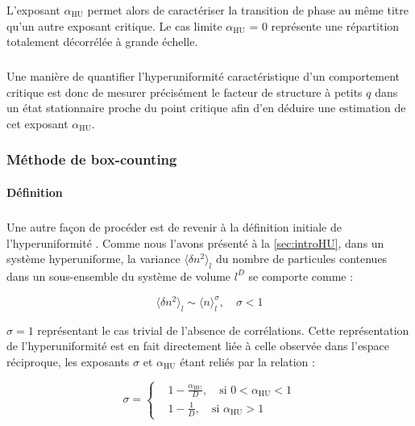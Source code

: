 \noindent L'exposant $\alpha_\text{HU}$ permet alors de caractériser la transition de phase au même titre qu'un autre exposant critique. Le cas limite $\alpha_\text{HU}$ = 0 représente une répartition totalement décorrélée à grande échelle.

\subparagraph{}Une manière de quantifier l'hyperuniformité caractéristique d'un comportement critique est donc de mesurer précisément le facteur de structure à petits $q$ dans un état stationnaire proche du point critique afin d'en déduire une estimation de cet exposant $\alpha_\text{HU}$.

\subsubsection{Méthode de box-counting}

\paragraph{Définition}

\subparagraph{}Une autre façon de procéder est de revenir à la définition initiale de l'hyperuniformité \cite{torquato_local_2003}. Comme nous l'avons présenté à la \autoref{sec:introHU}, dans un système hyperuniforme, la variance $\langle \delta n^2\rangle_l$ du nombre de particules contenues dans un sous-ensemble du système de volume $l^D$ se comporte comme :

\begin{equation}
	\langle \delta n^2\rangle_l \sim \langle n \rangle_l^\sigma , \quad  \sigma < 1
	\label{eq:HUBC}
\end{equation}

\noindent $\sigma = 1$ représentant le cas trivial de l'absence de corrélations. Cette représentation de l'hyperuniformité est en fait directement liée à celle observée dans l'espace réciproque, les exposants $\sigma$ et $\alpha_\text{HU}$ étant reliés par la relation \cite{torquato_local_2003, lei_non_equilibrium_2024, hexner_hyperuniformity_2015} :

\begin{equation}
	\sigma = \left\{
	\begin{aligned}
	&1-\frac{\alpha_\text{HU}}{D}, \quad\text{si } 0 < \alpha_\text{HU} < 1 \\
	&1-\frac{1}{D}, \quad \text{si } \alpha_\text{HU} > 1
	\end{aligned}
	\right.
	\label{eq:eqsigmaalphahu}
\end{equation}

